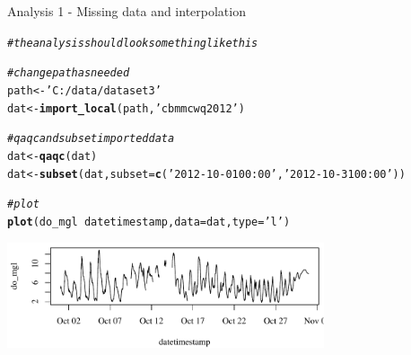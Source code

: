 \documentclass[xcolor=svgnames]{beamer}\usepackage[]{graphicx}\usepackage[]{color}
\makeatletter
\newcommand{\hlstr}[1]{\textcolor[rgb]{0.192,0.494,0.8}{#1}}%
\newcommand{\hlcom}[1]{\textcolor[rgb]{0.678,0.584,0.686}{\textit{#1}}}%
\newcommand{\hlopt}[1]{\textcolor[rgb]{0,0,0}{#1}}%
\newcommand{\hlstd}[1]{\textcolor[rgb]{0.345,0.345,0.345}{#1}}%
\newcommand{\hlkwb}[1]{\textcolor[rgb]{0.69,0.353,0.396}{#1}}%
\newcommand{\hlkwc}[1]{\textcolor[rgb]{0.333,0.667,0.333}{#1}}%
\newcommand{\hlkwd}[1]{\textcolor[rgb]{0.737,0.353,0.396}{\textbf{#1}}}%
\newenvironment{kframe}{%
 \def\at@end@of@kframe{}%
 \ifinner\ifhmode%
  \def\at@end@of@kframe{\end{minipage}}%
  \begin{minipage}{\columnwidth}%
 \fi\fi%
 \def\FrameCommand##1{\hskip\@totalleftmargin \hskip-\fboxsep
 \colorbox{shadecolor}{##1}\hskip-\fboxsep
     \hskip-\linewidth \hskip-\@totalleftmargin \hskip\columnwidth}%
 \MakeFramed {\advance\hsize-\width
   \@totalleftmargin\z@ \linewidth\hsize
   \@setminipage}}%
 {\par\unskip\endMakeFramed%
 \at@end@of@kframe}
\newenvironment{knitrout}{}{} %
\makeatother
\begin{document}
\begin{frame}[containsverbatim]{Analysis 1 - Missing data and interpolation}
\begin{knitrout}\scriptsize
{}\color{fgcolor}\begin{kframe}
\begin{alltt}
\hlcom{# the analysis should look something like this}

\hlcom{# change path as needed}
\hlstd{path} \hlkwb{<-} \hlstr{'C:/data/dataset3'}
\hlstd{dat} \hlkwb{<-} \hlkwd{import_local}\hlstd{(path,} \hlstr{'cbmmcwq2012'}\hlstd{)}

\hlcom{# qaqc and subset imported data}
\hlstd{dat} \hlkwb{<-} \hlkwd{qaqc}\hlstd{(dat)}
\hlstd{dat} \hlkwb{<-} \hlkwd{subset}\hlstd{(dat,} \hlkwc{subset} \hlstd{=} \hlkwd{c}\hlstd{(}\hlstr{'2012-10-01 00:00'}\hlstd{,} \hlstr{'2012-10-31 00:00'}\hlstd{))}

\hlcom{# plot}
\hlkwd{plot}\hlstd{(do_mgl} \hlopt{~} \hlstd{datetimestamp,} \hlkwc{data} \hlstd{= dat,} \hlkwc{type} \hlstd{=} \hlstr{'l'}\hlstd{)}
\end{alltt}
\end{kframe}
\end{knitrout}
\begin{knitrout}\scriptsize
{}\color{fgcolor}

{\centering \includegraphics[width=0.7\textwidth]{figure/unnamed-chunk-15} 

}



\end{knitrout}
\end{frame}
\end{document}
